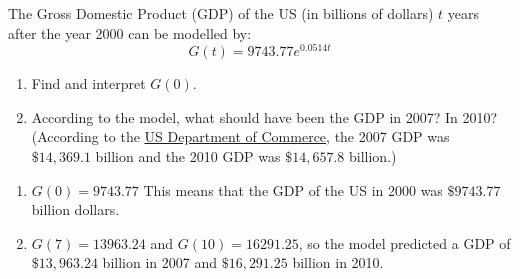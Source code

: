 {The Gross Domestic Product (GDP) of the US (in billions of dollars) $t$ years after the year 2000 can be modelled by: \[ G(t) = 9743.77 e^{0.0514t}\]

\begin{enumerate}

\item  Find and interpret $G(0)$.

\item  According to the model, what should have been the GDP in 2007?  In 2010?  (According to the   \href{http://1.usa.gov/iimT40}{\underline{US Department of Commerce}}, the 2007 GDP was $\$14,369.1$ billion and the 2010 GDP was $\$14,657.8$ billion.)

\end{enumerate}}
{\begin{enumerate}  \item  $G(0) = 9743.77$  This means that the GDP of the US in 2000 was $\$9743.77$ billion dollars.

\item  $G(7) = 13963.24$ and $G(10) = 16291.25$, so the model predicted a GDP of $\$ 13,963.24$ billion in 2007 and $\$ 16,291.25$ billion in 2010. 

\end{enumerate}}